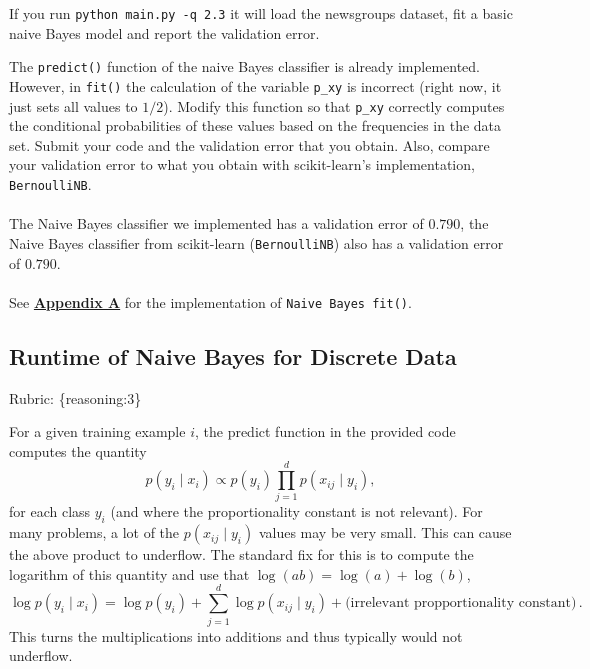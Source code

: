 \documentclass{article}
\def\rubric#1{\gre{Rubric: \{#1\}}}{}
\def\blu#1{{\color{blu}#1}}
\def\gre#1{{\color{gre}#1}}
\def\ans#1{{\color{ans}#1}}
\def\cond{\; | \;}
\begin{document}
If you run \texttt{python main.py -q 2.3}
it will load the newsgroups dataset, fit a basic naive Bayes model and report the validation error.

The \texttt{predict()} function of the naive Bayes classifier is already implemented.
However, in \texttt{fit()}
the calculation of the variable \texttt{p\_xy} is incorrect
(right now, it just sets all values to $1/2$).
\blu{Modify this function so that \texttt{p\_xy} correctly
computes the conditional probabilities of these values based on the
frequencies in the data set. Submit your code and the validation error that you obtain.
Also, compare your validation error to what you obtain with scikit-learn's implementation, \texttt{BernoulliNB}.} \\ \\
\ans{
   The Naive Bayes classifier we implemented has a validation error of $0.790$, the Naive Bayes classifier 
   from scikit-learn (\texttt{BernoulliNB}) also has a validation error of $0.790$. \\ \\
   See \hyperref[appendix:NaiveBayes]{\textbf{Appendix A}} for the implementation of \texttt{Naive Bayes fit()}.\\
}

\subsection{Runtime of Naive Bayes for Discrete Data}
\rubric{reasoning:3}

For a given training example $i$, the predict function in the provided code computes the quantity
\[
p(y_i \cond x_i) \propto p(y_i)\prod_{j=1}^d p(x_{ij} \cond y_i),
\]
for each class $y_i$ (and where the proportionality constant is not relevant). For many problems, a lot of the $p(x_{ij} \cond y_i)$ values may be very small. This can cause the above product to underflow. The standard fix for this is to compute the logarithm of this quantity and use that $\log(ab) = \log(a)+\log(b)$,
\[
\log p(y_i \cond x_i) = \log p(y_i) + \sum_{j=1}^d \log p(x_{ij} \cond y_i) + \text{(irrelevant propportionality constant)} \, .
\]
This turns the multiplications into additions and thus typically would not underflow.
\end{document}
